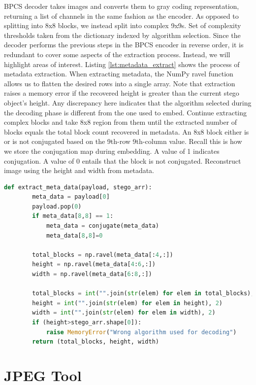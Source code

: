 \documentclass{l4proj}
\begin{document}
BPCS decoder takes images and converts them to gray coding representation, returning a list of channels in the same fashion as the encoder. As opposed to splitting into 8x8 blocks, we instead split into complex 9x9s. Set of complexity thresholds taken from the dictionary indexed by algorithm selection. Since the decoder performs the previous steps in the BPCS encoder in reverse order, it is redundant to cover some aspects of the extraction process. Instead, we will highlight areas of interest. Listing \ref{lst:metadata_extract} shows the process of metadata extraction. When extracting metadata, the NumPy ravel function \citep{ravel} allows us to flatten the desired rows into a single array. Note that extraction raises a memory error if the recovered height is greater than the current stego object's height. Any discrepancy here indicates that the algorithm selected during the decoding phase is different from the one used to embed. Continue extracting complex blocks and take 8x8 region from them until the extracted number of blocks equals the total block count recovered in metadata. An 8x8 block either is or is not conjugated based on the 9th-row 9th-column value. Recall this is how we store the conjugation map during embedding. A value of 1 indicates conjugation. A value of 0 entails that the block is not conjugated. Reconstruct image using the height and width from metadata.

\begin{lstlisting}[language=python, float, caption={Extraction of metadata by the BPCS tool decoder component}, label=lst:metadata_extract]
    def extract_meta_data(payload, stego_arr):
        meta_data = payload[0]  
        payload.pop(0)
        if meta_data[8,8] == 1:
            meta_data = conjugate(meta_data)
            meta_data[8,8]=0
            
        total_blocks = np.ravel(meta_data[:4,:])
        height = np.ravel(meta_data[4:6,:])
        width = np.ravel(meta_data[6:8,:])
        
        total_blocks = int("".join(str(elem) for elem in total_blocks), 2)
        height = int("".join(str(elem) for elem in height), 2)
        width = int("".join(str(elem) for elem in width), 2)
        if (height>stego_arr.shape[0]):
            raise MemoryError("Wrong algorithm used for decoding")
        return (total_blocks, height, width)
\end{lstlisting}

\section{JPEG Tool}\label{jpeg_implementation}
\end{document}
